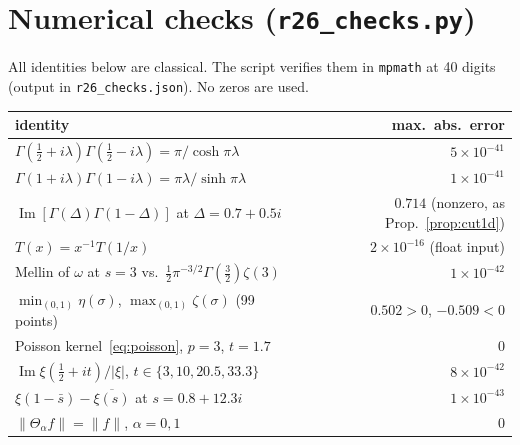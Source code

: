 \documentclass[11pt,a4paper]{article}
\theoremstyle{plain}
\theoremstyle{definition}
\theoremstyle{remark}
\renewcommand{\Im}{\operatorname{Im}}
\begin{document}
\section{Numerical checks (\texttt{r26\_checks.py})}
All identities below are classical. The script verifies them in
\texttt{mpmath} at 40 digits (output in \texttt{r26\_checks.json}). No zeros
are used.
\begin{center}
\begin{tabular}{lr}
\toprule
identity & max.\ abs.\ error\\
\midrule
$\Gamma(\tfrac12+i\lambda)\Gamma(\tfrac12-i\lambda)=\pi/\cosh\pi\lambda$ & $5\times10^{-41}$\\
$\Gamma(1+i\lambda)\Gamma(1-i\lambda)=\pi\lambda/\sinh\pi\lambda$ & $1\times10^{-41}$\\
$\Im[\Gamma(\Delta)\Gamma(1-\Delta)]$ at $\Delta=0.7+0.5i$ & $0.714$ (nonzero, as Prop.~\ref{prop:cut1d})\\
$T(x)=x^{-1}T(1/x)$ & $2\times10^{-16}$ (float input)\\
Mellin of $\omega$ at $s=3$ vs.\ $\tfrac12\pi^{-3/2}\Gamma(\tfrac32)\zeta(3)$ & $1\times10^{-42}$\\
$\min_{(0,1)}\eta(\sigma)$, $\max_{(0,1)}\zeta(\sigma)$ (99 points) & $0.502>0$, $-0.509<0$\\
Poisson kernel~\eqref{eq:poisson}, $p=3$, $t=1.7$ & $0$\\
$\Im\xi(\tfrac12+it)/|\xi|$, $t\in\{3,10,20.5,33.3\}$ & $8\times10^{-42}$\\
$\xi(1-\bar s)-\overline{\xi(s)}$ at $s=0.8+12.3i$ & $1\times10^{-43}$\\
$\|\Theta_\alpha f\|=\|f\|$, $\alpha=0,1$ & $0$\\
\bottomrule
\end{tabular}
\end{center}
\end{document}
